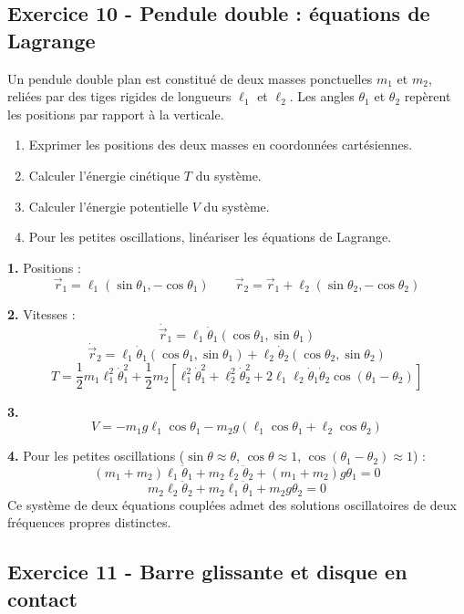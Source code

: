 \documentclass[12pt,a4paper]{article}
\begin{document}
\subsection*{Exercice 10 - Pendule double : équations de Lagrange \niveau{\difficile}}

\begin{boiteexercice}
Un pendule double plan est constitué de deux masses ponctuelles $m_1$ et $m_2$, reliées par des tiges rigides de longueurs $\ell_1$ et $\ell_2$. Les angles $\theta_1$ et $\theta_2$ repèrent les positions par rapport à la verticale.
\begin{enumerate}
  \item Exprimer les positions des deux masses en coordonnées cartésiennes.
  \item Calculer l'énergie cinétique $T$ du système.
  \item Calculer l'énergie potentielle $V$ du système.
  \item Pour les petites oscillations, linéariser les équations de Lagrange.
\end{enumerate}
\end{boiteexercice}

\begin{boitecorrige}
\textbf{1.} Positions :
\[
\vec{r}_1 = \ell_1(\sin\theta_1,-\cos\theta_1) \qquad \vec{r}_2 = \vec{r}_1 + \ell_2(\sin\theta_2,-\cos\theta_2)
\]

\textbf{2.} Vitesses :
\[
\dot{\vec{r}}_1 = \ell_1\dot{\theta}_1(\cos\theta_1,\sin\theta_1)
\]
\[
\dot{\vec{r}}_2 = \ell_1\dot{\theta}_1(\cos\theta_1,\sin\theta_1) + \ell_2\dot{\theta}_2(\cos\theta_2,\sin\theta_2)
\]
\[
T = \frac{1}{2}m_1\ell_1^2\dot{\theta}_1^2 + \frac{1}{2}m_2\!\left[\ell_1^2\dot{\theta}_1^2 + \ell_2^2\dot{\theta}_2^2 + 2\ell_1\ell_2\dot{\theta}_1\dot{\theta}_2\cos(\theta_1-\theta_2)\right]
\]

\textbf{3.}
\[
V = -m_1g\ell_1\cos\theta_1 - m_2g(\ell_1\cos\theta_1+\ell_2\cos\theta_2)
\]

\textbf{4.} Pour les petites oscillations ($\sin\theta\approx\theta$, $\cos\theta\approx1$, $\cos(\theta_1-\theta_2)\approx1$) :
\[
(m_1+m_2)\ell_1\ddot{\theta}_1 + m_2\ell_2\ddot{\theta}_2 + (m_1+m_2)g\theta_1 = 0
\]
\[
m_2\ell_2\ddot{\theta}_2 + m_2\ell_1\ddot{\theta}_1 + m_2 g\theta_2 = 0
\]
Ce système de deux équations couplées admet des solutions oscillatoires de deux fréquences propres distinctes.
\end{boitecorrige}


\subsection*{Exercice 11 - Barre glissante et disque en contact \niveau{\difficile}}
\end{document}
